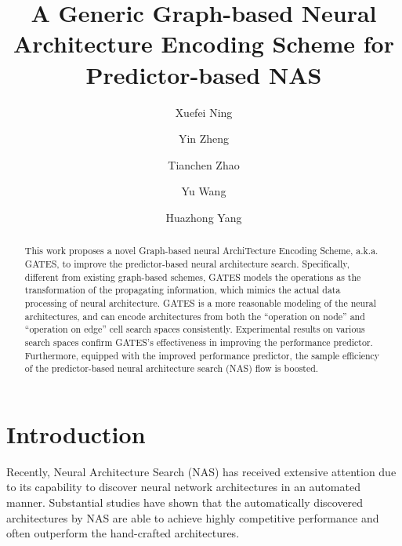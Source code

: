 \documentclass[runningheads]{llncs}
\begin{document}
\pagestyle{headings}
\mainmatter

\title{A Generic Graph-based Neural Architecture Encoding Scheme for Predictor-based NAS}



\author{
Xuefei Ning \and
Yin Zheng \and
Tianchen Zhao \and
Yu Wang \and
Huazhong Yang}

\maketitle

\begin{abstract}
This work proposes a novel Graph-based neural ArchiTecture Encoding Scheme, a.k.a. GATES, to improve the predictor-based neural architecture search.
Specifically, different from existing graph-based schemes, GATES models the operations as the transformation of the propagating information, which mimics the actual data processing of neural architecture.
  GATES is a more reasonable modeling of the neural architectures, and can encode architectures from both the ``operation on node'' and ``operation on edge'' cell search spaces consistently. 
Experimental results on various search spaces confirm GATES's effectiveness in improving the performance predictor. Furthermore, equipped with the improved performance predictor, the sample efficiency of the predictor-based neural architecture search (NAS) flow is boosted.


\end{abstract}


\section{Introduction}
\label{sec:intro}

Recently, Neural Architecture Search (NAS) has received extensive attention due to its capability to discover neural network architectures in an automated manner. 
Substantial studies have shown that the automatically discovered architectures by NAS are able to achieve
highly competitive performance and often outperform the hand-crafted architectures.
\end{document}

